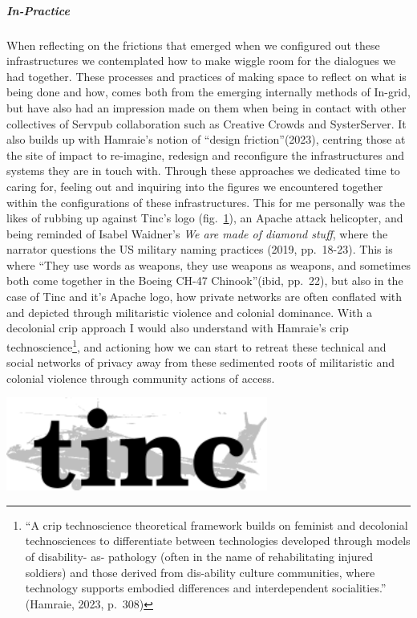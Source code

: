 \hypertarget{in-practice}{%
\subparagraph[In-Practice]{\texorpdfstring{\protect\hypertarget{anchor}{}{}In-Practice}{In-Practice}}\label{in-practice}}

When reflecting on the frictions that emerged when we configured out
these infrastructures we contemplated how to make wiggle room for the
dialogues we had together. These processes and practices of making space
to reflect on what is being done and how, comes both from the emerging
internally methods of In-grid, but have also had an impression made on
them when being in contact with other collectives of Servpub
collaboration such as Creative Crowds and SysterServer. It also builds
up with Hamraie's notion of ``design friction''(2023), centring those at
the site of impact to re-imagine, redesign and reconfigure the
infrastructures and systems they are in touch with. Through these
approaches we dedicated time to caring for, feeling out and inquiring
into the figures we encountered together within the configurations of
these infrastructures. This for me personally was the likes of rubbing
up against Tinc's logo (fig.~\protect\hyperlink{fig:tincLogo}{1}), an
Apache attack helicopter, and being reminded of Isabel Waidner's
\emph{We are made of diamond stuff}, where the narrator questions the US
military naming practices (2019, pp.~18-23). This is where ``They use
words as weapons, they use weapons as weapons, and sometimes both come
together in the Boeing CH-47 Chinook''(ibid, pp.~22), but also in the
case of Tinc and it's Apache logo, how private networks are often
conflated with and depicted through militaristic violence and colonial
dominance. With a decolonial crip approach I would also understand with
Hamraie's crip technoscience\footnote{``A crip technoscience theoretical
  framework builds on feminist and decolonial technosciences to
  differentiate between technologies developed through models of
  disability- as- pathology (often in the name of rehabilitating injured
  soldiers) and those derived from dis-ability culture communities,
  where technology supports embodied differences and interdependent
  socialities.'' (Hamraie, 2023, p.~308)}, and actioning how we can
start to retreat these technical and social networks of privacy away
from these sedimented roots of militaristic and colonial violence
through community actions of access.

\includegraphics[width=3.38889in,height=1.20833in]{./media_05_In-Configure-Ability/Pictures/0.png}

